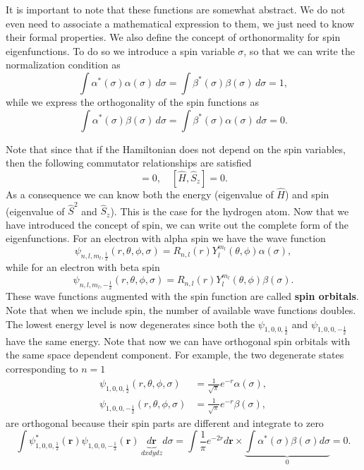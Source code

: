 \documentclass[../Main/chem331-notes.tex]{subfiles}
\begin{document}
It is important to note that these functions are somewhat abstract. We do not even need to associate a mathematical expression to them, we just need to know their formal properties.
We also define the concept of orthonormality for spin eigenfunctions.
To do so we introduce a spin variable $\sigma$, so that we can write the normalization condition as
\begin{equation}
\int \alpha^*(\sigma) \alpha(\sigma) \, d\sigma = \int \beta^*(\sigma) \beta(\sigma) \, d\sigma  = 1,
\end{equation}
while we express the orthogonality of the spin functions as
\begin{equation}
\int \alpha^*(\sigma) \beta(\sigma) \, d\sigma = \int \beta^*(\sigma) \alpha(\sigma) \, d\sigma  = 0.
\end{equation}

Note that since that if the Hamiltonian does not depend on the spin variables, then the following commutator relationships are satisfied
\begin{equation}
[\hat{H}, \hat{S}^2] = 0, \quad [\hat{H}, \hat{S}_z] = 0.
\end{equation}
As a consequence we can know both the energy (eigenvalue of $\hat{H}$) and spin (eigenvalue of $\hat{S}^2$ and $\hat{S}_z$). 
This is the case for the hydrogen atom. Now that we have introduced the concept of spin, we can write out the complete form of the eigenfunctions.
For an electron with alpha spin we have the wave function
\begin{equation}
\psi_{n,l,m_l,\frac{1}{2}}(r,\theta,\phi,\sigma) = R_{n,l}(r) Y_l^{m_l}(\theta,\phi) \alpha(\sigma),
\end{equation}
while for an electron with beta spin
\begin{equation}
\psi_{n,l,m_l,-\frac{1}{2}}(r,\theta,\phi,\sigma) = R_{n,l}(r) Y_l^{m_l}(\theta,\phi) \beta(\sigma).
\end{equation}
These wave functions augmented with the spin function are called \textbf{spin orbitals}.
Note that when we include spin, the number of available wave functions doubles.
The lowest energy level is now degenerates since both the $\psi_{1,0,0,\frac{1}{2}}$ and $\psi_{1,0,0,-\frac{1}{2}}$ have the same energy.
Note that now we can have orthogonal spin orbitals with the same space dependent component.
For example, the two degenerate states corresponding to $n = 1$
\begin{align}
\psi_{1,0,0,\frac{1}{2}}(r,\theta,\phi,\sigma) & = \frac{1}{\sqrt{\pi}} e^{-r} \alpha(\sigma), \\
\psi_{1,0,0,-\frac{1}{2}}(r,\theta,\phi,\sigma) & = \frac{1}{\sqrt{\pi}} e^{-r} \beta(\sigma),
\end{align}
are orthogonal because their spin parts are different and integrate to zero
\begin{equation}
\int \psi_{1,0,0,\frac{1}{2}}^*(\mathbf{r}) \psi_{1,0,0,-\frac{1}{2}}(\mathbf{r}) \, \underbrace{d\mathbf{r}}_{dx dy dz} d\sigma = 
\int \frac{1}{\pi} e^{-2r} d\mathbf{r} \times  \underbrace{\int  \alpha^*(\sigma)\beta(\sigma) d\sigma}_{0}  = 0.
\end{equation}
\end{document}
